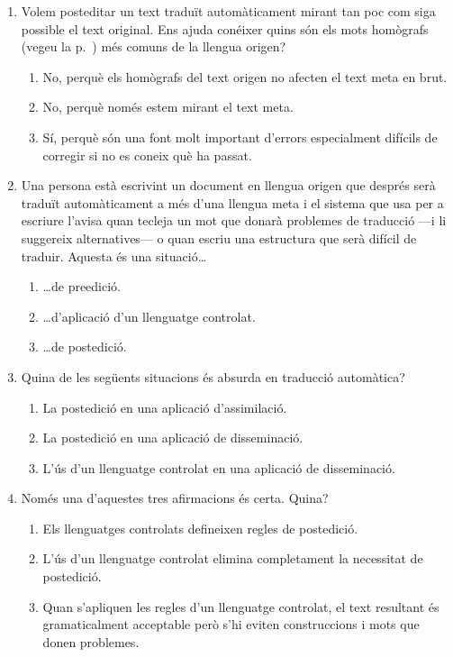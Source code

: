 \begin{enumerate}
\item Volem posteditar un text traduït automàticament mirant tan
   poc com siga possible el text original. Ens ajuda conéixer quins
   són els mots homògrafs (vegeu la p.~\pageref{pg:homografia}) més comuns de la llengua origen?
   
\begin{enumerate}
\item No, perquè els homògrafs del text origen no afecten el text meta en brut.
\item No, perquè només estem mirant el text meta.
\item Sí, perquè són una font molt important d'errors
      especialment difícils
      de corregir si no es coneix què ha passat.
\end{enumerate}

\item Una persona està escrivint un document en llengua origen que
  després serà traduït automàticament a més d'una llengua meta i el
  sistema que usa per a escriure l'avisa quan tecleja un mot que
  donarà problemes de traducció ---i li suggereix alternatives--- o
  quan escriu una estructura que serà difícil de traduir. Aquesta és
  una situació\ldots
\begin{enumerate}
\item \ldots de preedició.
\item \ldots d'aplicació d'un llenguatge controlat.
\item \ldots de postedició.
\end{enumerate}


\item Quina de les següents situacions és absurda en traducció automàtica? 
  \begin{enumerate}
   \item La postedició en una aplicació d'assimilació.
   \item La postedició en una aplicació de disseminació.
   \item L'ús d'un llenguatge controlat en una aplicació de disseminació.
  \end{enumerate}


\item Només una d'aquestes tres afirmacions és certa. Quina?
  \begin{enumerate}
  \item Els llenguatges controlats defineixen regles de
    postedició.
  \item L'ús d'un llenguatge controlat elimina completament la
    necessitat de postedició.
  \item Quan s'apliquen les regles d'un llenguatge controlat, el text
    resultant és gramaticalment acceptable però s'hi eviten
    construccions i mots que donen problemes.
  \end{enumerate}




\end{enumerate}
